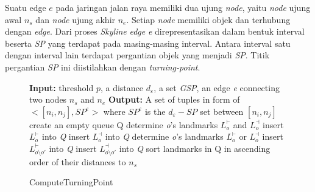 \documentclass[conference]{IEEEtran}
\begin{document}
Suatu edge $ e $ pada jaringan jalan raya memiliki dua ujung \textit{node}, yaitu \textit{node} ujung awal $ n_s $ dan \textit{node} ujung akhir $ n_e $. Setiap \textit{node} memiliki objek dan terhubung dengan \textit{edge}. Dari proses  \textit{Skyline} \textit{edge} \textit{e} direpresentasikan dalam bentuk interval beserta \textit{SP} yang terdapat pada masing-masing interval. Antara interval satu dengan interval lain terdapat pergantian objek yang menjadi \textit{SP}. Titik pergantian \textit{SP} ini diistilahkan dengan \textit{turning-point}.

\begin{figure}
	\begin{algorithm}[H]
		\label{compute_turning_point}
		\caption{ComputeTurningPoint}
		\begin{algorithmic}[1]
			\State \textbf{Input: }threshold $ p $, a distance $ d_\varepsilon $, a set \textit{GSP}, an edge \textit{e} connecting two nodes $ n_s $ and $ n_e $
			\State \textbf{Output:} A set of tuples in form of $ < [n_i, n_j], SP^\varepsilon >$ where $ SP^\varepsilon $ is the $ d_\varepsilon-SP $ set between $ [n_i, n_j] $
			\State create an empty queue Q
			\State determine \textit{o}'s landmarks $ L_o^\vdash $ and $ L_o^\dashv $
			insert $ L_o^\vdash $ into \textit{Q}
			\EndIf
			insert $ L_o^\dashv $ into \textit{Q}
			\EndIf
			\State determine \textit{o}'s landmarks $ L_o^\vdash $ or $ L_o^\dashv $
			\State insert $ L_{o \setminus o'}^\vdash $ into \textit{Q}
			\EndIf
			\State insert $ L_{o \setminus o'}^\dashv $ into \textit{Q}
			\EndIf
			\EndFor
			\EndFor
			\State sort landmarks in Q in ascending order of their distances to $ n_s $
			

\end{algorithmic}
\end{algorithm}
\end{figure}
\end{document}
